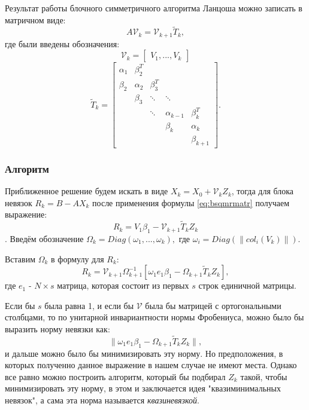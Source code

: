 Результат работы блочного симметричного алгоритма Ланцоша можно записать в матричном
виде:
\begin{equation}
    \label{eq:bsqmrmatr}
A\mathcal{V}_k = \mathcal{V}_{k+1} \tilde{T}_k,
\end{equation}
где были введены обозначения:
\begin{equation*}
    \mathcal{V}_k = \begin{bmatrix} V_1, ... , V_k \end{bmatrix}
\end{equation*}
\begin{equation*}
    \tilde{T}_k = \begin{bmatrix}
                    \alpha_1 & \beta_2^T & & & \\
                    \beta_2 & \alpha_2 & \beta_3^T & & \\
                    & \beta_3 & \ddots & \ddots & \\
                    & & \ddots & \alpha_{k-1} & \beta_{k}^T \\
                    & & & \beta_k & \alpha_k \\
                    & & & & \beta_{k+1}
                  \end{bmatrix}.
\end{equation*}
\subsubsection[Алгоритм]{Алгоритм}
Приближенное решение будем искать в виде $X_k = X_0 + \mathcal{V}_k Z_k$, тогда для 
блока невязок $R_k = B - AX_k$ после применения формулы \eqref{eq:bsqmrmatr} получаем выражение:
$$R_k = V_1 \beta_1 - \mathcal{V}_{k+1}\tilde{T}_k Z_k$$.
Введём обозначение $\Omega_k = Diag(\omega_1,...,\omega_k),$ где $\omega_i = Diag(\| col_i(V_k) \|)$.

Вставим $\Omega_k$ в формулу для $R_k$: 
$$R_k = \mathcal{V}_{k+1} \Omega_{k+1}^{-1} \left[ \omega_1 e_1 \beta_1 - \Omega_{k+1} \tilde{T}_k Z_k \right],$$
где $e_1$ - $N \times s$ матрица, которая состоит из первых $s$ строк единичной матрицы.  

Если бы $s$ была равна 1, и если бы $\mathcal{V}$ была бы матрицей с ортогональными столбцами, то по 
унитарной инвариантности нормы Фробениуса, можно было бы выразить норму невязки как:
$$\| \omega_1 e_1 \beta_1 - \Omega_{k+1} \tilde{T}_k Z_k \|,$$ 
и дальше можно было бы минимизировать эту норму. Но предположения, в которых полученно
данное выражение в нашем случае не имеют места. Однако все равно можно построить алгоритм,
который бы подбирал $Z_k$ такой, чтобы минимизировать эту норму, в этом и заключается идея "квазиминимальных невязок", а сама эта норма называется \textit{квазиневязкой}.

